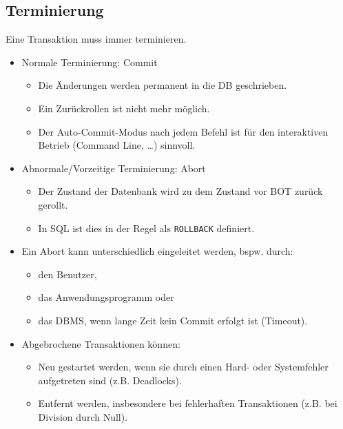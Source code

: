         \subsection{Terminierung} %
        	Eine Transaktion muss immer terminieren.
            \begin{itemize}
            	\item Normale Terminierung: Commit
            		\begin{itemize}
            			\item Die Änderungen werden permanent in die DB geschrieben.
            			\item Ein Zurückrollen ist nicht mehr möglich.
            			\item Der Auto-Commit-Modus nach jedem Befehl ist für den interaktiven Betrieb (Command Line, \dots) sinnvoll.
            		\end{itemize}
            	\item Abnormale/Vorzeitige Terminierung: Abort
            		\begin{itemize}
            			\item Der Zustand der Datenbank wird zu dem Zustand vor BOT zurück gerollt.
            			\item In SQL ist dies in der Regel als \lstinline|ROLLBACK| definiert.
            		\end{itemize}
            	\item Ein Abort kann unterschiedlich eingeleitet werden, bspw. durch:
            		\begin{itemize}
            			\item den Benutzer,
            			\item das Anwendungsprogramm oder
            			\item das DBMS, wenn lange Zeit kein Commit erfolgt ist (Timeout).
            		\end{itemize}
            	\item Abgebrochene Transaktionen können:
            		\begin{itemize}
            			\item Neu gestartet werden, wenn sie durch einen Hard- oder Systemfehler aufgetreten sind (z.B. Deadlocks).
            			\item Entfernt werden, insbesondere bei fehlerhaften Transaktionen (z.B. bei Division durch Null).
            		\end{itemize}
            \end{itemize}

